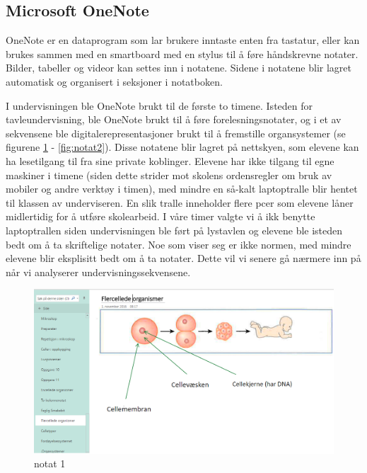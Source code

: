 \documentclass[main.tex]{subfiles}
\begin{document}
\subsection*{Microsoft OneNote}

OneNote er en dataprogram som lar brukere inntaste enten fra tastatur, eller kan brukes sammen
med en smartboard med en stylus til å føre håndskrevne notater. Bilder, tabeller og videor kan 
settes inn i notatene. Sidene i notatene blir lagret automatisk og organisert i seksjoner i
notatboken.

I undervisningen ble OneNote brukt til de første to timene. Isteden for tavleundervisning, 
ble OneNote brukt til å føre forelesningsnotater, og i et av sekvensene ble 
digitalerepresentasjoner brukt til å fremstille organsystemer (se figurene \ref{fig:notat1} -
\ref{fig:notat2}). Disse notatene blir lagret på nettskyen, som elevene kan ha lesetilgang til
fra sine private koblinger. Elevene har ikke tilgang til egne maskiner i timene (siden dette 
strider mot skolens ordensregler om bruk av mobiler og andre verktøy i timen), med mindre en 
så-kalt laptoptralle blir hentet til klassen av underviseren. En slik tralle inneholder flere 
pcer som elevene låner midlertidig for å utføre skolearbeid. I våre timer valgte vi å ikk 
benytte laptoptrallen siden undervisningen ble ført på lystavlen og elevene ble isteden bedt 
om å ta skriftelige notater. Noe som viser seg er ikke normen, med mindre elevene blir 
eksplisitt bedt om å ta notater. Dette vil vi senere gå nærmere inn på når vi analyserer 
undervisningssekvensene.

\begin{figure}[h!]
\includegraphics[scale = 0.6]{../figures/onenote_flercellet.png}
\caption{notat 1}
\label{fig:notat1}
\end{figure}
\end{document}
